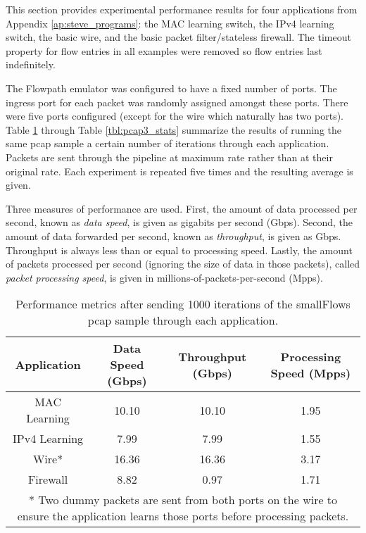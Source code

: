 This section provides experimental performance results for four applications from Appendix \ref{ap:steve_programs}: the MAC learning switch, the IPv4 learning switch, the basic wire, and the basic packet filter/stateless firewall. The timeout property for flow entries in all examples were removed so flow entries last indefinitely.

The Flowpath emulator was configured to have a fixed number of ports. The ingress port for each packet was randomly assigned amongst these ports. There were five ports configured (except for the wire which naturally has two ports). Table \ref{tbl:pcap1_stats} through Table \ref{tbl:pcap3_stats} summarize the results of running the same pcap sample a certain number of iterations through each application. Packets are sent through the pipeline at maximum rate rather than at their original rate. Each experiment is repeated five times and the resulting average is given.

Three measures of performance are used. First, the amount of data processed per second, known as \textit{data speed}, is given as gigabits per second (Gbps). Second, the amount of data forwarded per second, known as \textit{throughput}, is given as Gbps. Throughput is always less than or equal to processing speed. Lastly, the amount of packets processed per second (ignoring the size of data in those packets), called \textit{packet processing speed}, is given in millions-of-packets-per-second (Mpps).

\begin{table}
\caption{Performance metrics after sending 1000 iterations of the smallFlows pcap sample through each application.}
\begin{center}
\begin{tabularx}{\linewidth}{| c || c | c | c | }
\hline
Application & Data Speed (Gbps) & Throughput (Gbps) & Processing Speed (Mpps)  \\
\hline
MAC Learning & 10.10 & 10.10 & 1.95  \\
\hline
IPv4 Learning & 7.99 & 7.99 & 1.55  \\
\hline 
Wire* & 16.36 & 16.36 & 3.17 \\
\hline
Firewall & 8.82 & 0.97 & 1.71 \\
\hline
\multicolumn{4}{p{\linewidth}}{* Two dummy packets are sent from both ports on the wire to ensure the application learns those ports before processing packets.}
\end{tabularx}
\end{center}
\label{tbl:pcap1_stats}
\end{table}


